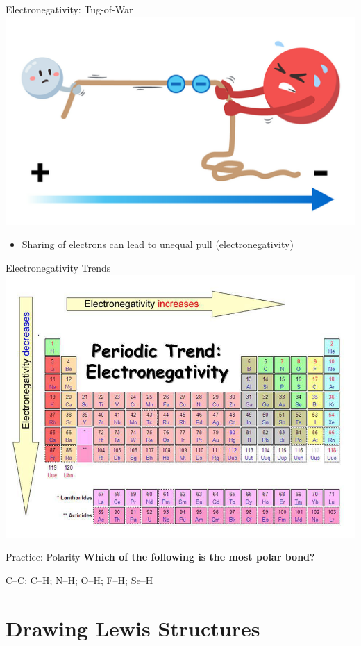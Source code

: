 \documentclass[11pt]{beamer}
\begin{document}
\begin{frame}{Electronegativity: Tug-of-War}
  \centering
  \includegraphics[width=0.8\linewidth]{water_tug}
  \begin{itemize}
  \item Sharing of electrons can lead to unequal pull
    (electronegativity)
  \end{itemize}
\end{frame}

\begin{frame}{Electronegativity Trends}
  \centering
  \includegraphics[width=\linewidth]{electronegativity}
\end{frame}

\begin{frame}{Practice: Polarity}
  \textbf{Which of the following is the most polar bond?}

    C--C; C--H; N--H; O--H; F--H; Se--H
\end{frame}

\section{Drawing Lewis Structures}
\end{document}
